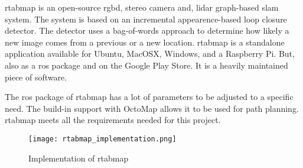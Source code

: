 \acs{rtabmap} is an open\hyp{}source \acs{rgbd}, stereo camera and, \acs{lidar} graph\hyp{}based \acs{slam} system. The system is based on an incremental appearence\hyp{}based loop closure detector. The detector uses a bag\hyp{}of\hyp{}words approach to determine how likely a new image comes from a previous or a new location. \acs{rtabmap} is a standalone application available for Ubuntu, MacOSX, Windows, and a Raspberry Pi. But, also as a \acs{ros} package and on the Google Play Store. It is a heavily maintained piece of software. \cite{rtabmap_introlab}

The \acs{ros} package of \acs{rtabmap} has a lot of parameters to be adjusted to a specific need. The build\hyp{}in support with OctoMap allows it to be used for path planning. \acs{rtabmap} meets all the requirements needed for this project.

\begin{figure}[!h]
  \centering
  \texttt{[image: rtabmap\_implementation.png]}
  \caption{Implementation of \acs{rtabmap}}
  \label{fig:rtabmap_implementation}
\end{figure}